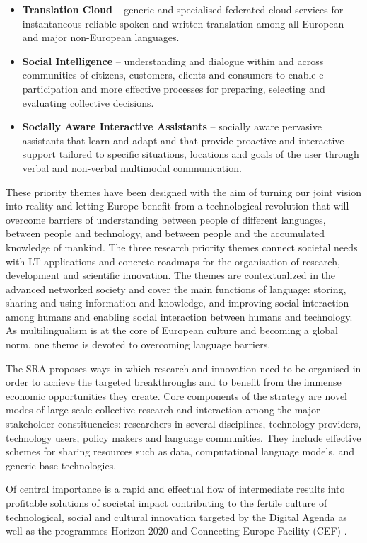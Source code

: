 \documentclass[10pt, plain]{../../metanetpaper}
\begin{document}
\begin{multicols}{2}
\begin{itemize}
\item \textbf{Translation Cloud} – generic and specialised federated cloud services for instantaneous reliable spoken and written translation among all European and major non-European languages.
\item \textbf{Social Intelligence} – understanding and dialogue within and across communities of citizens, customers, clients and consumers to enable e-participation and more effective processes for preparing, selecting and evaluating collective decisions.
\item \textbf{Socially Aware Interactive Assistants} – socially aware pervasive assistants that learn and adapt and that provide proactive and interactive support tailored to specific situations, locations and goals of the user through verbal and non-verbal multimodal communication.
\end{itemize}

These priority themes have been designed with the aim of turning our joint vision into reality and letting Europe beneﬁt from a technological revolution that will overcome barriers of understanding between people of diﬀerent languages, between people and technology, and between people and the accumulated knowledge of mankind. The three research priority themes connect societal needs with LT applications and concrete roadmaps for the organisation of research, development and scientiﬁc innovation. The themes are contextualized in the advanced networked society and cover the main functions of language: storing, sharing and using information and knowledge, and improving social interaction among humans and enabling social interaction between humans and technology. As multilingualism is at the core of European culture and becoming a global norm, one theme is devoted to overcoming language barriers. 

The SRA proposes ways in which research and innovation need to be organised in order to achieve the targeted breakthroughs and to beneﬁt from the immense economic opportunities \cite{bruegel12} they create. Core components of the strategy are novel modes of large-scale collective research and interaction among the major stakeholder constituencies: researchers in several disciplines, technology providers, technology users, policy makers and language communities. They include eﬀective schemes for sharing resources such as data, computational language models, and generic base technologies.

Of central importance is a rapid and eﬀectual ﬂow of intermediate results into proﬁtable solutions of societal impact contributing to the fertile culture of technological, social and cultural innovation targeted by the Digital Agenda \cite{DA2010} as well as the programmes Horizon 2020 \cite{H2020} and Connecting Europe Facility (CEF) \cite{CEF2011}. 


\end{multicols}
\end{document}
